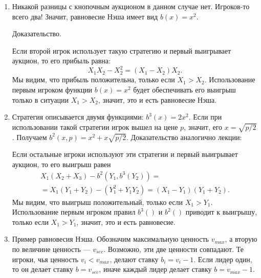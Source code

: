 \begin{enumerate}
\item  Никакой разницы с кнопочным аукционом в данном случае нет. Игроков-то всего два! Значит, равновесие Нэша имеет вид $ b(x)=x^{2} $. 

Доказательство.

Если второй игрок использует такую стратегию и первый выигрывает аукцион, то его прибыль равна:
\begin{equation}
X_{1}X_{2}-X_{2}^{2}=(X_{1}-X_{2})X_{2}.
\end{equation}
Мы видим, что прибыль положительна, только если $ X_{1}>X_{2} $. Использование первым игроком функции $ b(x)=x^{2} $ будет обеспечивать его выигрыш только в ситуации $ X_{1}>X_{2} $, значит, это и есть равновесие Нэша.


\item Стратегия описывается двумя функциями: $ b^{3}(x)=2x^{2} $. Если при использовании такой стратегии игрок вышел на цене $ p $, значит, его $ x=\sqrt{p/2} $. Получаем $ b^{2}(x,p)=x^{2}+x\sqrt{p/2}$. Доказательство аналогично лекции:

Если остальные игроки используют эти стратегии и первый выигрывает аукцион, то его выигрыш равен
\begin{multline}
X_{1}(X_{2}+X_{3})-b^{2}(Y_{1},b^{3}(Y_{2}))=\\
=X_{1}(Y_{1}+Y_{2})-(Y_{1}^{2}+Y_{1}Y_{2})=(X_{1}-Y_{1})(Y_{1}+Y_{2}).
\end{multline}
Мы видим, что выигрыш положительный, только если $ X_{1}>Y_{1} $. Использование первым игроком правил $ b^{3}() $ и $ b^{2}() $ приводит к выигрышу, только если $ X_{1}>Y_{1} $, значит, это и есть равновесие.


\item  Пример равновесия Нэша. Обозначим максимальную ценность $ v_{max} $, а вторую по величине ценность — $v_{sec}$. Возможно, эти две ценности совпадают. Те игроки, чья ценность $ v_{i}<v_{max} $, делают ставку $ b_{i}=v_{i}-1 $. Если лидер один, то он делает ставку $ b=v_{sec} $, иначе каждый лидер делает ставку $ b=v_{max}-1 $.


\end{enumerate}
